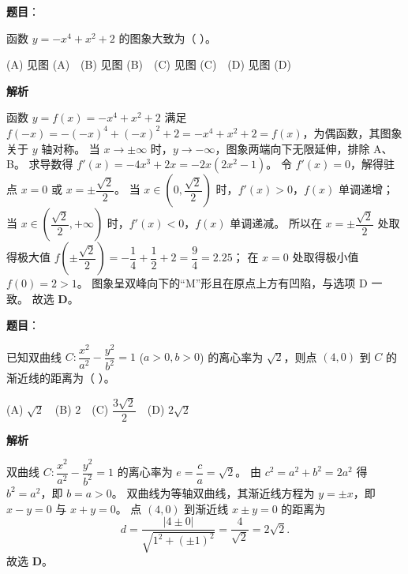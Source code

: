 \begin{answer}

\textbf{题目}：

函数 $y = -x^4 + x^2 + 2$ 的图象大致为（ ）。
\nopagebreak[4]
\begin{center}\end{center}
\nopagebreak[4]
(A) 见图 (A)　(B) 见图 (B)　(C) 见图 (C)　(D) 见图 (D)

\textbf{解析}

函数 $y = f(x) = -x^4 + x^2 + 2$ 满足 $f(-x) = -(-x)^4 + (-x)^2 + 2 = -x^4 + x^2 + 2 = f(x)$，为偶函数，其图象关于 $y$ 轴对称。
当 $x \to \pm\infty$ 时，$y \to -\infty$，图象两端向下无限延伸，排除 A、B。
求导数得 $f'(x) = -4x^3 + 2x = -2x(2x^2 - 1)$。
令 $f'(x) = 0$，解得驻点 $x = 0$ 或 $x = \pm\dfrac{\sqrt2}{2}$。
当 $x \in \left(0, \dfrac{\sqrt2}{2}\right)$ 时，$f'(x) > 0$，$f(x)$ 单调递增；
当 $x \in \left(\dfrac{\sqrt2}{2}, +\infty\right)$ 时，$f'(x) < 0$，$f(x)$ 单调递减。
所以在 $x = \pm\dfrac{\sqrt2}{2}$ 处取得极大值 $f\left(\pm\dfrac{\sqrt2}{2}\right) = -\dfrac14 + \dfrac12 + 2 = \dfrac94 = 2.25$；
在 $x = 0$ 处取得极小值 $f(0) = 2 > 1$。
图象呈双峰向下的“M”形且在原点上方有凹陷，与选项 D 一致。
故选 \textbf{D}。


\end{answer}
\begin{answer}

\textbf{题目}：

已知双曲线 $C: \dfrac{x^2}{a^2} - \dfrac{y^2}{b^2} = 1$ ($a > 0, b > 0$) 的离心率为 $\sqrt2$，则点 $(4, 0)$ 到 $C$ 的渐近线的距离为（ ）。

(A) $\sqrt2$　(B) $2$　(C) $\dfrac{3\sqrt2}{2}$　(D) $2\sqrt2$

\textbf{解析}

双曲线 $C: \dfrac{x^2}{a^2} - \dfrac{y^2}{b^2} = 1$ 的离心率为 $e = \dfrac{c}{a} = \sqrt2$。
由 $c^2 = a^2 + b^2 = 2a^2$ 得 $b^2 = a^2$，即 $b = a > 0$。
双曲线为等轴双曲线，其渐近线方程为 $y = \pm x$，即 $x - y = 0$ 与 $x + y = 0$。
点 $(4, 0)$ 到渐近线 $x \pm y = 0$ 的距离为
\nopagebreak[4]
\[d = \dfrac{|4 \pm 0|}{\sqrt{1^2 + (\pm 1)^2}} = \dfrac{4}{\sqrt2} = 2\sqrt2.\]
故选 \textbf{D}。


\end{answer}
